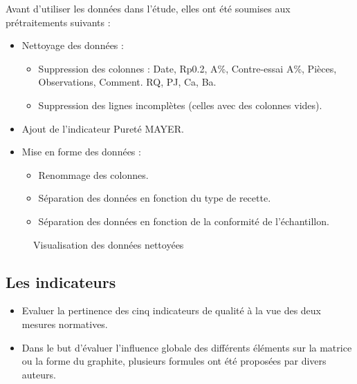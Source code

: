 \documentclass[12pt]{article}
\begin{document}


Avant d'utiliser les données dans l'étude, elles ont été soumises aux prétraitements suivants :

\begin{itemize}
\item Nettoyage des données :
\begin{itemize}
\item Suppression des colonnes : Date, Rp0.2, A\%, Contre-essai A\%, Pièces, Observations, Comment. RQ, PJ, Ca, Ba.
\item Suppression des lignes incomplètes (celles avec des colonnes vides).
\end{itemize}
\item Ajout de l'indicateur Pureté MAYER.
\item Mise en forme des données :
\begin{itemize}
\item Renommage des colonnes.
\item Séparation des données en fonction  du type de recette.
\item Séparation des données en fonction de la conformité de l'échantillon.
\end{itemize}
\end{itemize}
    


\begin{figure}[H]
    \centering
    \caption{Visualisation des données nettoyées}
    \label{fig:donnees_nettoyees}
\end{figure}


\subsection{Les indicateurs}





\begin{itemize}
  \item  Evaluer la pertinence des cinq indicateurs de qualité à la vue des deux mesures normatives.
  \item Dans le but d'évaluer l'influence globale des différents éléments sur la matrice ou la forme du graphite, plusieurs formules ont été proposées par divers auteurs.
\end{itemize}
\end{document}
